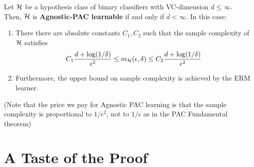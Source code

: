 \begin{theorem} 
    Let $\mathcal{H}$ be a hypothesis class of
    binary classifiers with VC-dimension $d\leq \infty$. 
    Then, $\mathcal{H}$ is {\bf Agnostic-PAC learnable} if and only if $d<\infty$. In this case: 
    \begin{enumerate}
      \item   There
    there are absolute constants $C_1,C_2$
    such that the sample complexity of $\mathcal{H}$ satisfies\[ C_1
    \frac{d + \log(1/\delta)}{\epsilon^2} \le m_{\mathcal{H}}(\epsilon,\delta) \le
    C_2 \frac{d + \log(1/\delta)}{\epsilon^2} \]
  \item  Furthermore, the upper bound on sample complexity is achieved by the ERM learner.
    \end{enumerate}
 \end{theorem}
  (Note that the price we pay for Agnostic PAC learning is that the sample
      complexity is proportional to $1/\epsilon^2$, not to $1/\epsilon$ as in
    the PAC Fundamental theorem)



\section{A Taste of the Proof}


